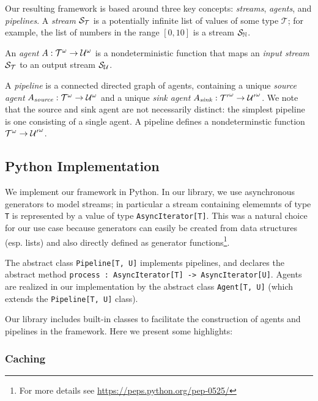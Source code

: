Our resulting framework is based around three key concepts: \emph{streams},
\emph{agents}, and \emph{pipelines}. A \emph{stream} $\mathcal{S}_{\mathcal{T}}$ is a
potentially infinite list of values of some type $\mathcal{T}$; for example, the
list of numbers in the range $[0, 10]$ is a stream $\mathcal{S}_{\mathbb{N}}$.

An \emph{agent} $A : {\mathcal{T}}^{\omega} \rightarrow
{\mathcal{U}}^{\omega}$ is a nondeterministic function that maps an \emph{input
stream} $\mathcal{S}_{\mathcal{T}}$ to an output stream $\mathcal{S}_{\mathcal{U}}$.

A \emph{pipeline} is a connected directed graph of agents, containing a unique
\emph{source agent} $A{}_{\mathit{source}} : {\mathcal{T}}^{\omega}
\rightarrow {\mathcal{U}}^{\omega}$ and a unique \emph{sink agent}
$A_{\mathit{sink}} : {\mathcal{T}'}^{\omega} \rightarrow
{\mathcal{U}'}^{\omega}$. We note that the source and sink agent are not
necessarily distinct: the simplest pipeline is one consisting of a single agent.
A pipeline defines a nondeterminstic function ${\mathcal{T}}^{\omega}
\rightarrow {\mathcal{U}'}^{\omega}$.

\subsection{Python Implementation}

We implement our framework in Python. In our library, we use asynchronous
generators to model streams; in particular a stream containing elememnts of type
\texttt{T} is represented by a value of type \texttt{AsyncIterator[T]}. This was
a natural choice for our use case because generators can easily be created from
data structures (esp. lists) and also directly defined as generator
functions\footnote{For more details see
\url{https://peps.python.org/pep-0525/}}.

 The abstract class
\texttt{Pipeline[T, U]} implements pipelines, and declares the abstract method
\texttt{process : AsyncIterator[T] -> AsyncIterator[U]}. Agents are realized in
our implementation by the abstract class \texttt{Agent[T, U]} (which extends the
\texttt{Pipeline[T, U]} class).

Our library includes built-in classes to facilitate the construction of agents
and pipelines in the framework. Here we present some highlights:

\subsubsection{Caching}

